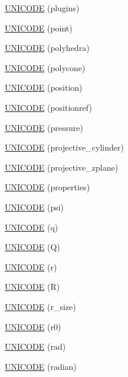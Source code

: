 \begin{DoxyCompactItemize}
\item 
\hyperlink{namespace_d_d4hep_1_1_x_m_l_a8045b45890f167a2e52bade0cb69e0b0}{UNICODE} (plugins)
\item 
\hyperlink{namespace_d_d4hep_1_1_x_m_l_a27622a43df40e123d453283bd7d6a299}{UNICODE} (point)
\item 
\hyperlink{namespace_d_d4hep_1_1_x_m_l_ac706886a7e8e345df430cefcf599474e}{UNICODE} (polyhedra)
\item 
\hyperlink{namespace_d_d4hep_1_1_x_m_l_abd7131b4e28a0f58c27412eee64879b5}{UNICODE} (polycone)
\item 
\hyperlink{namespace_d_d4hep_1_1_x_m_l_ab62b0dd1c3a8ee8b922efeacab631b71}{UNICODE} (position)
\item 
\hyperlink{namespace_d_d4hep_1_1_x_m_l_af46acbf8ffad8ee932b015566d09e903}{UNICODE} (positionref)
\item 
\hyperlink{namespace_d_d4hep_1_1_x_m_l_a295c897562467a0f3d6f86644b3f8467}{UNICODE} (pressure)
\item 
\hyperlink{namespace_d_d4hep_1_1_x_m_l_ab513f7266c526cdff63d86d83ee9f4f9}{UNICODE} (projective\_\-cylinder)
\item 
\hyperlink{namespace_d_d4hep_1_1_x_m_l_aa8b79772b842db484da613c5ed89043a}{UNICODE} (projective\_\-zplane)
\item 
\hyperlink{namespace_d_d4hep_1_1_x_m_l_a6e7b5f6dc407e16fcea4b75b29e3683e}{UNICODE} (properties)
\item 
\hyperlink{namespace_d_d4hep_1_1_x_m_l_a08057748aea5e2d33333c7d3a1f7bdb9}{UNICODE} (psi)
\item 
\hyperlink{namespace_d_d4hep_1_1_x_m_l_a95bdd403f699c09eeb71c77947ff7d59}{UNICODE} (q)
\item 
\hyperlink{namespace_d_d4hep_1_1_x_m_l_a40d06b3277e01706ffce794a886249f7}{UNICODE} (Q)
\item 
\hyperlink{namespace_d_d4hep_1_1_x_m_l_aaf712b747a42d392ce269dc44f27b203}{UNICODE} (r)
\item 
\hyperlink{namespace_d_d4hep_1_1_x_m_l_aef2bb178e2ab937c0ff31ac5bc7ee484}{UNICODE} (R)
\item 
\hyperlink{namespace_d_d4hep_1_1_x_m_l_aa68f5e3b7db9b2209492034fbe2d7f0d}{UNICODE} (r\_\-size)
\item 
\hyperlink{namespace_d_d4hep_1_1_x_m_l_a85ea7d80bd3befa4ee53f1a24a4987f1}{UNICODE} (r0)
\item 
\hyperlink{namespace_d_d4hep_1_1_x_m_l_a9277b500f3f3becdee4faa89e3ea79b5}{UNICODE} (rad)
\item 
\hyperlink{namespace_d_d4hep_1_1_x_m_l_ab01e99276488dcc59d7e8c61bdddb88b}{UNICODE} (radian)

\end{DoxyCompactItemize}
